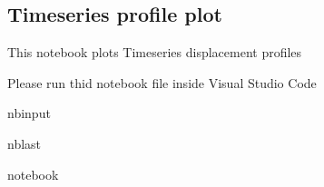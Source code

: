 \documentclass[letterpaper,10pt]{sphinxmanual}
\begin{document}
\sphinxstepscope


\subsection{Time\sphinxhyphen{}series profile plot}
\label{\detokenize{notebooks/akhdefo_ts_plot:Time-series-profile-plot}}\label{\detokenize{notebooks/akhdefo_ts_plot::doc}}
\sphinxAtStartPar
This notebook plots Time\sphinxhyphen{}series displacement profiles

\sphinxAtStartPar
{}

\sphinxAtStartPar
Please run thid notebook file inside Visual Studio Code

\begin{sphinxuseclass}{nbinput}
\begin{sphinxuseclass}{nblast}
{
\begin{sphinxVerbatim}[commandchars=\\\{\}]
\llap{\color{nbsphinxin}[1]:\,\hspace{\fboxrule}\hspace{\fboxsep}} notebook
    

\end{sphinxVerbatim}
}

\end{sphinxuseclass}
\end{sphinxuseclass}
\end{document}
